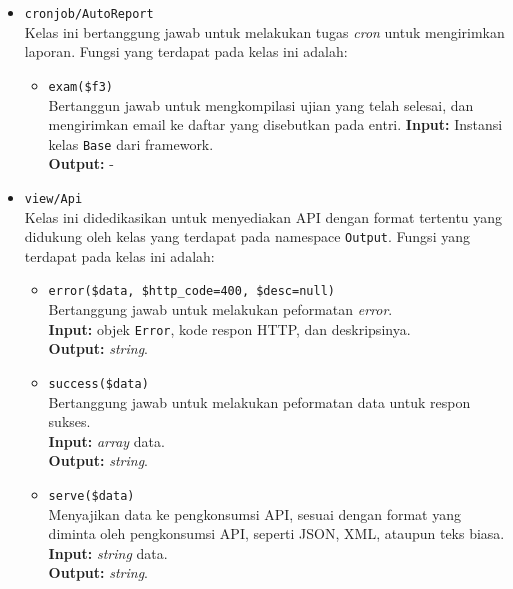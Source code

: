 \begin{itemize}
        \item \texttt{cronjob/AutoReport} \\
            Kelas ini bertanggung jawab untuk melakukan tugas \textit{cron}
            untuk mengirimkan laporan. Fungsi yang terdapat pada kelas ini
            adalah:
            \begin{itemize}
                \item \texttt{exam(\$f3)} \\
                    Bertanggun jawab untuk mengkompilasi ujian yang telah
                    selesai, dan mengirimkan email ke daftar yang disebutkan
                    pada entri. \textbf{Input:} Instansi kelas \texttt{Base}
                    dari framework.\\
                    \textbf{Output:} -
            \end{itemize}
            
        \item \texttt{view/Api} \\
            Kelas ini didedikasikan untuk menyediakan API dengan format tertentu
            yang didukung oleh kelas yang terdapat pada namespace
            \texttt{Output}. Fungsi yang terdapat pada kelas ini adalah:
            \begin{itemize}
                \item \texttt{error(\$data, \$http\_code=400, \$desc=null)} \\
                    Bertanggung jawab untuk melakukan peformatan \textit{error}.
                    \\
                    \textbf{Input:} objek \texttt{Error}, kode respon HTTP, dan
                    deskripsinya.\\
                    \textbf{Output:} \textit{string}.
                    
                \item \texttt{success(\$data)} \\
                    Bertanggung jawab untuk melakukan peformatan data untuk
                    respon sukses. \\
                    \textbf{Input:} \textit{array} data.\\
                    \textbf{Output:} \textit{string}.
                
                \item \texttt{serve(\$data)} \\
                    Menyajikan data ke pengkonsumsi API, sesuai dengan format
                    yang diminta oleh pengkonsumsi API, seperti JSON, XML,
                    ataupun teks biasa.\\
                    \textbf{Input:} \textit{string} data.\\
                    \textbf{Output:} \textit{string}.
            \end{itemize}
            

\end{itemize}
